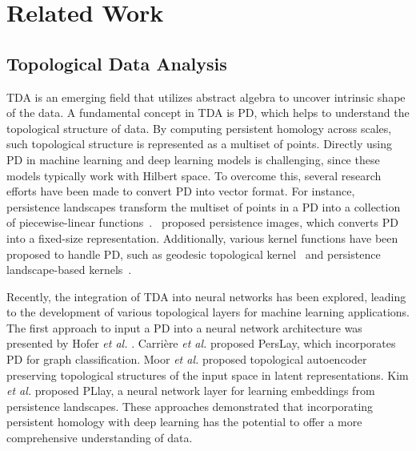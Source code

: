 \section{Related Work}
\subsection{Topological Data Analysis}
TDA is an emerging field that utilizes abstract algebra to uncover intrinsic shape of the data. A fundamental concept in TDA is PD, which helps to understand the topological structure of data. By computing persistent homology across scales, such topological structure is represented as a multiset of points. Directly using PD in machine learning and deep learning models is challenging, since these models typically work with Hilbert space. To overcome this, several research efforts have been made to convert PD into vector format. For instance, persistence landscapes transform the multiset of points in a PD into a collection of piecewise-linear functions~\cite{bubenik2015statistical}.~\cite{adams2017persistence} proposed persistence images, which converts PD into a fixed-size representation. Additionally, various kernel functions have been proposed to handle PD, such as geodesic topological kernel~\cite{padellini2021supervised} and persistence landscape-based kernels~\cite{zhu2016stochastic, bubenik2020persistence}.

Recently, the integration of TDA into neural networks has been explored, leading to the development of various topological layers for machine learning applications. The first approach to input a PD into a neural network architecture was presented by Hofer \textit{et al.} \cite{hofer2017deep}. Carrière \textit{et al.} \cite{carriere2020perslay} proposed PersLay, which incorporates PD for graph classification. Moor \textit{et al.} \cite{moor2020topological} proposed topological autoencoder preserving topological structures of the input space in latent representations. Kim \textit{et al.} \cite{kim2020pllay} proposed PLlay, a neural network layer for learning embeddings from persistence landscapes. These approaches demonstrated that incorporating persistent homology with deep learning has the potential to offer a more comprehensive understanding of data. %

